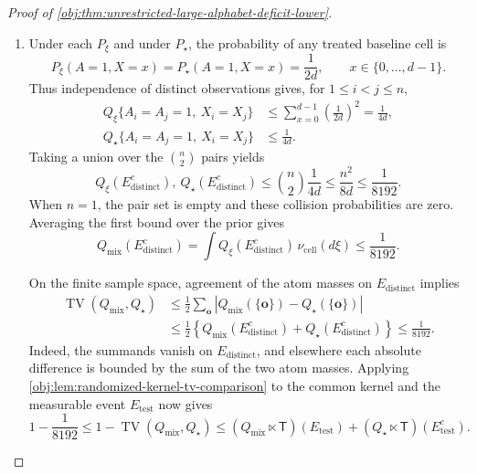 \begin{proof}[Proof of \cref{obj:thm:unrestricted-large-alphabet-deficit-lower}]
\begin{enumerate}
\item Under each \(P_\xi\) and under \(P_\star\), the probability of any treated baseline cell is
\[
P_\xi(A=1,X=x)=P_\star(A=1,X=x)=\frac1{2d},
\qquad x\in\{0,\ldots,d-1\}.
\]
Thus independence of distinct observations gives, for \(1\le i<j\le n\),
\[
\begin{aligned}
Q_\xi\{A_i=A_j=1,\ X_i=X_j\}
&\le
\sum_{x=0}^{d-1}\left(\frac1{2d}\right)^2
=\frac1{4d},
\\
Q_\star\{A_i=A_j=1,\ X_i=X_j\}
&\le\frac1{4d}.
\end{aligned}
\]
Taking a union over the \(\binom n2\) pairs yields
\[
Q_\xi(E_{\mathrm{distinct}}^c),
\ Q_\star(E_{\mathrm{distinct}}^c)
\le
\binom n2\frac1{4d}
\le\frac{n^2}{8d}
\le\frac1{8192}.
\]
When \(n=1\), the pair set is empty and these collision probabilities are zero. Averaging the first bound over the prior gives
\[
Q_{\mathrm{mix}}(E_{\mathrm{distinct}}^c)
=
\int Q_\xi(E_{\mathrm{distinct}}^c)\,
\nu_{\mathrm{cell}}(d\xi)
\le\frac1{8192}.
\]

On the finite sample space, agreement of the atom masses on
\(E_{\mathrm{distinct}}\) implies
\[
\begin{aligned}
\operatorname{TV}(Q_{\mathrm{mix}},Q_\star)
&\le
\frac12\sum_{\mathbf o}
\left|Q_{\mathrm{mix}}(\{\mathbf o\})
-Q_\star(\{\mathbf o\})\right|
\\
&\le
\frac12\left\{
Q_{\mathrm{mix}}(E_{\mathrm{distinct}}^c)
+Q_\star(E_{\mathrm{distinct}}^c)
\right\}
\le\frac1{8192}.
\end{aligned}
\]
Indeed, the summands vanish on \(E_{\mathrm{distinct}}\), and elsewhere each absolute difference is bounded by the sum of the two atom masses. Applying
\cref{obj:lem:randomized-kernel-tv-comparison} to the common kernel and the measurable event \(E_{\mathrm{test}}\) now gives
\[
1-\frac1{8192}
\le
1-\operatorname{TV}(Q_{\mathrm{mix}},Q_\star)
\le
(Q_{\mathrm{mix}}\ltimes\mathsf T)(E_{\mathrm{test}})
+
(Q_\star\ltimes\mathsf T)(E_{\mathrm{test}}^c).
\]


\end{enumerate}
\end{proof}

